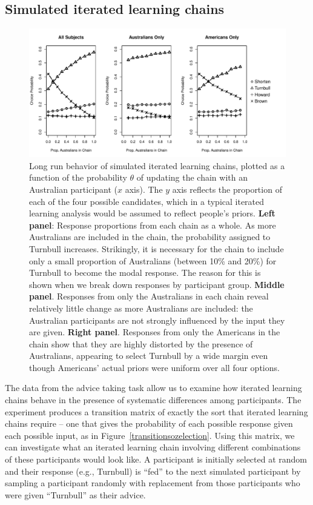 \documentclass[doc]{apa6}
\begin{document}
\subsection{Simulated iterated learning chains}

\begin{figure}[t]
\begin{center}
\includegraphics[width=15cm]{chainPol.pdf}
\caption{\small{Long run behavior of simulated iterated learning chains, plotted as a function of the probability $\theta$ of updating the chain with an Australian participant ($x$ axis). The $y$ axis reflects the proportion of each of the four possible candidates, which in a typical iterated learning analysis would be assumed to reflect people's priors.  {\bf Left panel}: Response proportions from each chain as a whole. As more Australians are included in the chain, the probability assigned to Turnbull increases. Strikingly, it is necessary for the chain to include only a small proportion of Australians (between 10\% and 20\%) for Turnbull to become the modal response. The reason for this is shown when we break down responses by participant group. {\bf Middle panel}. Responses from only the Australians in each chain reveal relatively little change as more Australians are included: the Australian participants are not strongly influenced by the input they are given. {\bf Right panel}. Responses from only the Americans in the chain show that they are highly distorted by the presence of Australians, appearing to select Turnbull by a wide margin even though Americans' actual priors were uniform over all four options.}}
\label{chainPol}
\end{center}
\end{figure}


The data from the {\sc advice taking} task allow us to examine how iterated learning chains behave in the presence of systematic differences among participants. The experiment produces a transition matrix of exactly the sort that iterated learning chains require -- one that gives the probability of each possible response given each possible input, as in Figure~\ref{transitionsozelection}. Using this matrix, we can investigate what an iterated learning chain involving different combinations of these participants would look like. A participant is initially selected at random and their response (e.g., Turnbull) is ``fed'' to the next simulated participant by sampling a participant randomly with replacement from those participants who were given ``Turnbull'' as their advice. 
\end{document}
